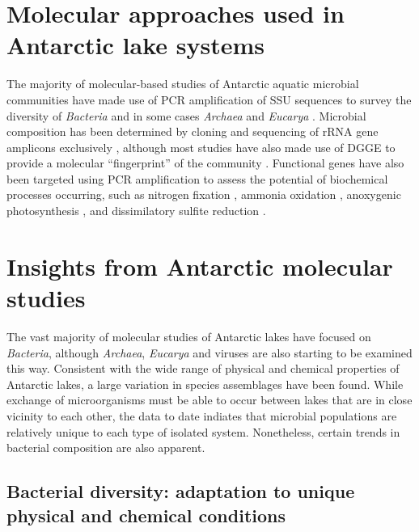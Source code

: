 \section{Molecular approaches used in Antarctic lake systems}
\label{in:mol}
The majority of molecular-based studies of Antarctic aquatic microbial communities have made use of \ac{PCR} amplification of \ac{SSU} sequences to survey the diversity of \emph{Bacteria}
 and in some cases \emph{Archaea} and \emph{Eucarya} .
Microbial composition has been determined by cloning and sequencing of \ac{rRNA} gene amplicons exclusively 
\cite{Bowman2000a, Bowman2000b, Gordon2000, Christner2001, Purdy2003, Karr2006, Matsuzaki2006, Kurosawa2010, Bielewicz2011}, 
although most studies have also made use of \ac{DGGE} to provide a molecular ``fingerprint'' of the community 
\cite{Pearce2003a, Pearce2003b, Karr2005, Pearce2005a, Pearce2005b, Unrein2005, Glatz2006, Mikucki2007, Mosier2007, Schiaffino2009, Villaescusa2010}.
Functional genes have also been targeted using \ac{PCR} amplification to assess the potential of biochemical processes occurring, such as nitrogen fixation \cite{Olson1998}, 
ammonia oxidation \cite{Voytek1999}, anoxygenic photosynthesis \cite{Karr2003}, and dissimilatory sulfite reduction \cite{Karr2005, Mikucki2009}. %
%


\section{Insights from Antarctic molecular studies}
\label{in:insights}
The vast majority of molecular studies of Antarctic lakes have focused on \emph{Bacteria}, although \emph{Archaea}, \emph{Eucarya} and viruses are also starting to be examined this way.
Consistent with the wide range of physical and chemical properties of Antarctic lakes, a large variation in species assemblages have been found.
While exchange of microorganisms must be able to occur between lakes that are in close vicinity to each other, 
 the data to date indiates that microbial populations are relatively unique to each type of isolated system. 
Nonetheless, certain trends in bacterial composition are also apparent.


\subsection{Bacterial diversity: adaptation to unique physical and chemical conditions}

